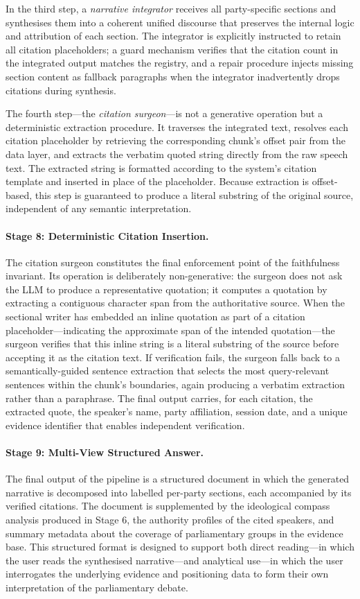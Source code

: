 In the third step, a \textit{narrative integrator} receives all party-specific sections and
synthesises them into a coherent unified discourse that preserves the internal logic and
attribution of each section. The integrator is explicitly instructed to retain all citation
placeholders; a guard mechanism verifies that the citation count in the integrated output
matches the registry, and a repair procedure injects missing section content as fallback
paragraphs when the integrator inadvertently drops citations during synthesis.

The fourth step---the \textit{citation surgeon}---is not a generative operation but a
deterministic extraction procedure. It traverses the integrated text, resolves each
citation placeholder by retrieving the corresponding chunk's offset pair from the data
layer, and extracts the verbatim quoted string directly from the raw speech text. The
extracted string is formatted according to the system's citation template and inserted in
place of the placeholder. Because extraction is offset-based, this step is guaranteed to
produce a literal substring of the original source, independent of any semantic
interpretation.

\paragraph{Stage 8: Deterministic Citation Insertion.}
The citation surgeon constitutes the final enforcement point of the faithfulness invariant.
Its operation is deliberately non-generative: the surgeon does not ask the LLM to produce
a representative quotation; it computes a quotation by extracting a contiguous character
span from the authoritative source. When the sectional writer has embedded an inline
quotation as part of a citation placeholder---indicating the approximate span of the
intended quotation---the surgeon verifies that this inline string is a literal substring
of the source before accepting it as the citation text. If verification fails, the surgeon
falls back to a semantically-guided sentence extraction that selects the most query-relevant
sentences within the chunk's boundaries, again producing a verbatim extraction rather than
a paraphrase. The final output carries, for each citation, the extracted quote, the
speaker's name, party affiliation, session date, and a unique evidence identifier that
enables independent verification.

\paragraph{Stage 9: Multi-View Structured Answer.}
The final output of the pipeline is a structured document in which the generated narrative
is decomposed into labelled per-party sections, each accompanied by its verified citations.
The document is supplemented by the ideological compass analysis produced in Stage 6, the
authority profiles of the cited speakers, and summary metadata about the coverage of
parliamentary groups in the evidence base. This structured format is designed to support
both direct reading---in which the user reads the synthesised narrative---and analytical
use---in which the user interrogates the underlying evidence and positioning data to form
their own interpretation of the parliamentary debate.
